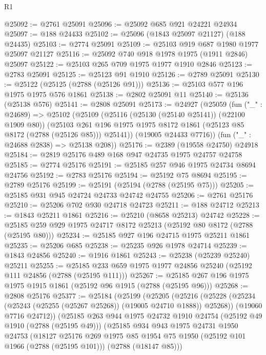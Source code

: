 \begin{lexlean}{R1}
\begin{coremodule}
@25092 := @2761 @25091
@25096 := @25092 @685 @921 @24221 @24934
@25097 := @188 @24433
@25102 := @25096 (@1843 @25097 @21127) (@188 @24435)
@25103 := @2774 @25091
@25109 := @25103 @919 @687 @1980 @1977 @25097 @21127
@25116 := @25092 @740 @918 @1978 @1975 (@1911 @2846) @25097
@25122 := @25103 @265 @709 @1975 @1977 @1910 @2846
@25123 := @2783 @25091
@25125 := @25123 @91 @1910
@25126 := @2789 @25091
@25130 := @25122 (@25125 (@2788 (@25126 @91)))
@25136 := @25103 @577 @196 @1975 @1975 @576 @1861
@25138 := @2802 @25091 @11
@25140 := @25136 (@25138 @576)
@25141 := @2808 @25091
@25173 := @24927
    (@25059
      (fun ("_" : @24689) =>
      @25102
        (@25109
          (@25116 (@25130 (@25140 @25141)) (@22100 @1909 @80))
          (@25103 @261 @196 @1975 @1975 @8172 @1861 (@25123 @85 @8172 (@2788 (@25126 @85))) @25141))
        (@19005 @24433 @7716))
      (fun ("_" : @24688 @2838) => @25138 @208))
@25176 := @2389 (@19558 @24750) @24918
@25184 := @2819 @25176 @489 @168 @947 @24735 @1975 @24757 @24758
@25185 := @2774 @25176
@25191 := @25185 @257 @946 @1975 @24734 @8694 @24756
@25192 := @2783 @25176
@25194 := @25192 @75 @8694
@25195 := @2789 @25176
@25199 := @25191 (@25194 (@2788 (@25195 @75)))
@25205 := @25185 @931 @945 @24724 @24733 @24742 @24755
@25206 := @2761 @25176
@25210 := @25206 @702 @930 @24718 @24723
@25211 := @188 @24712
@25213 := @1843 @25211 @1861
@25216 := @25210 (@8658 @25213) @24742
@25228 := @25185 @259 @929 @1975 @24717 @8172 @25213 (@25192 @80 @8172 (@2788 (@25195 @80)))
@25234 := @25185 @927 @196 @24715 @1975 @25211 @1861
@25235 := @25206 @685
@25238 := @25235 @926 @1978 @24714
@25239 := @1843 @24856
@25240 := @1916 @1861
@25243 := @25238 (@25239 @25240) @25211
@25255 := @25185 @233 @659 @1975 @1977 @24856 @25240 (@25192 @111 @24856 (@2788 (@25195 @111)))
@25267 := @25185 @267 @196 @1975 @1975 @1915 @1861 (@25192 @96 @1915 (@2788 (@25195 @96)))
@25268 := @2808 @25176
@25377 := @25184
    (@25199
      (@25205
        (@25216
          (@25228 (@25234 (@25243 (@25255 (@25267 @25268)) (@19005 @24710 @1888)) @25268))
          (@19060 @7716 @24712))
        (@25185
          @263
          @944
          @1975
          @24732
          @1910
          @24754
          (@25192 @49 @1910 (@2788 (@25195 @49)))
          (@25185
            @934
            @943
            @1975
            @24731
            @1950
            @24753
            (@18127
              @25176
              @269
              @1975
              @85
              @1954
              @75
              @1950
              (@25192 @101 @1966 (@2788 (@25195 @101)))
              (@2788 (@18147 @85)))

\end{coremodule}
\end{lexlean}

